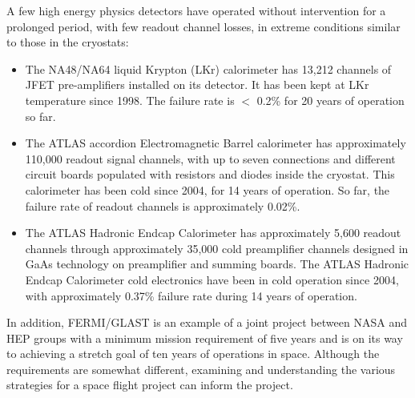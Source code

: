 A few high energy physics detectors have operated without intervention for a 
prolonged period, with few readout channel losses, in extreme 
conditions similar to those in the  cryostats:
\begin{itemize}
	\item The NA48/NA64 liquid Krypton (LKr) calorimeter has 13,212 channels 
	of JFET pre-amplifiers installed on its detector. It has been kept at LKr temperature 
	since 1998. The failure rate is $<$ 0.2\% for 20 years of operation so far.
	\item The ATLAS  accordion Electromagnetic Barrel calorimeter has 
	approximately 110,000 readout signal channels, with up to seven connections and different 
	circuit boards populated with resistors and diodes inside the cryostat. This
        calorimeter has been cold since 2004, for 14 years of operation. So far, the
        failure rate of readout channels is approximately 0.02\%.
	\item The ATLAS  Hadronic Endcap Calorimeter has approximately 5,600 
	readout channels through approximately 35,000 cold preamplifier channels designed in GaAs 
        technology on preamplifier and summing boards. The ATLAS  Hadronic Endcap 
        Calorimeter cold electronics have been in cold operation since 2004, with approximately 
        0.37\% failure rate during 14 years of operation. 
\end{itemize}
In addition, FERMI/GLAST is an example of a joint project between NASA and HEP groups 
with a minimum mission requirement of five years and is on its way to achieving a 
stretch goal of ten years of operations in space. Although the requirements are somewhat 
different, examining and understanding the various strategies for a space 
flight project can inform the  project. 

